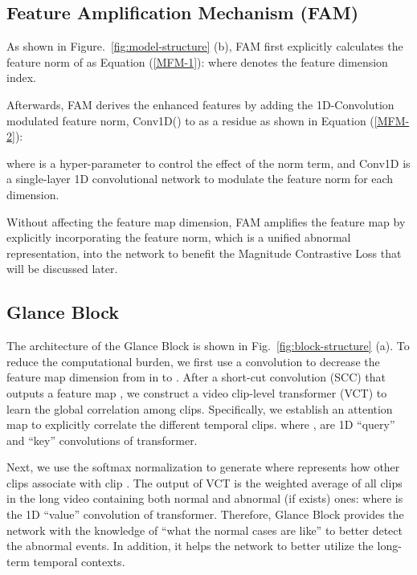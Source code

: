 \documentclass[letterpaper]{article} \usepackage{aaai23}  \usepackage{times}  \usepackage{helvet}  \usepackage{courier}  \usepackage[hyphens]{url}  \usepackage{graphicx} \urlstyle{rm} \def\UrlFont{\rm}  \usepackage{natbib}  \usepackage{caption} \frenchspacing  \setlength{\pdfpagewidth}{8.5in}  \setlength{\pdfpageheight}{11in}  \usepackage{algorithm}
\begin{document}
\subsection{Feature Amplification Mechanism (FAM)} 
As shown in Figure.~\ref{fig:model-structure} (b), FAM first explicitly calculates the feature norm {\small} of {\small} as Equation (\ref{MFM-1}):
{\small}
where  denotes the feature dimension index. 

Afterwards, FAM derives the enhanced features  {\small} by adding the 1D-Convolution modulated feature norm, Conv1D({\small}) to {\small} as a residue as shown in Equation (\ref{MFM-2}): 
{\small}

\noindent where  is a hyper-parameter to control the effect of the norm term, and Conv1D is a single-layer 1D convolutional network to modulate the feature norm for each dimension. 

Without affecting the feature map dimension, FAM amplifies the feature map by explicitly incorporating the feature norm, which is a unified abnormal representation, into the network to benefit the Magnitude Contrastive Loss that will be discussed later. 



\subsection{Glance Block}
\label{glance}
The architecture of the Glance Block is shown in Fig.~\ref{fig:block-structure} (a). To reduce the computational burden, we first use a convolution to decrease the feature map dimension from {\small} in {\small} to {\small}. After a short-cut convolution (SCC) that outputs a feature map {\small}, we construct a video clip-level transformer (VCT) to learn the global correlation among clips. Specifically, we establish an attention map {\small} to explicitly correlate the different temporal clips. 
{\small}
where {\small}, {\small} are 1D ``query'' and ``key'' convolutions of transformer.  

Next, we use the softmax normalization to generate {\small} where {\small} represents how other clips associate with clip . 
{\small}
The output of VCT {\small} is the weighted average of all clips in the long video containing both normal and abnormal (if exists) ones: 
{\small}
where {\small} is the 1D ``value'' convolution of transformer. 
Therefore, Glance Block provides the network with the knowledge of ``what the normal cases are like'' to better detect the abnormal events. In addition, it helps the network to better utilize the long-term temporal contexts. 
\end{document}
